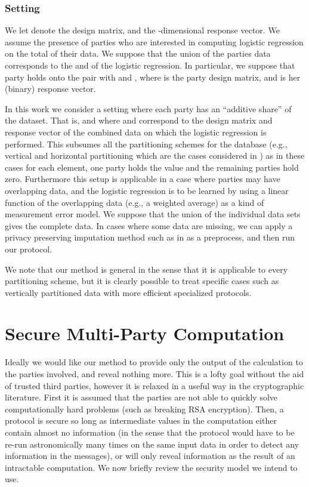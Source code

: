 \documentclass[11pt]{article}
\begin{document}
\subsubsection*{Setting}

We let  denote the  design matrix, and  the -dimensional response vector. We assume the presence of  parties who are interested in computing logistic regression on the total of their data.  We suppose that the union of the parties data corresponds to the  and  of the logistic regression.  In particular, we suppose that party  holds onto the pair  with  and , where  is the  party design matrix, and  is her (binary) response vector.

In this work we consider a setting where each party has an ``additive share'' of the dataset.  That is,  and  where  and  correspond to the design matrix and response vector of the combined data on which the logistic regression is performed.  This subsumes all the partitioning schemes for the database (e.g., vertical and horizontal partitioning which are the cases considered in \cite{ppdm_book}) as in these cases for each element, one party holds the value and the remaining parties hold zero.  Furthermore this setup is applicable in a case where parties may have overlapping data, and the logistic regression is to be learned by using a linear function of the overlapping data (e.g., a weighted average) as a kind of measurement error model.  We suppose that the union of the individual data sets gives the complete data.  In cases where some data are missing, we can apply a privacy preserving imputation method such as in \citet{jagannathan}  as a preprocess, and then run our protocol.

We note that our method is general in the sense that it is applicable to every partitioning scheme, but it is clearly possible to treat specific cases such as vertically partitioned data  with more efficient specialized protocols.


\section{Secure Multi-Party Computation}\label{sec:smpc}

Ideally we would like our method to provide only the output of the calculation to the parties involved, and reveal nothing more.  This is a lofty goal without the aid of trusted third parties, however it is relaxed in a useful way in the cryptographic literature.  First it is assumed that the parties are not able to quickly solve computationally hard problems (such as breaking RSA encryption).  Then, a protocol is secure so long as intermediate values in the computation either contain almost no information (in the sense that the protocol would have to be re-run astronomically many times on the same input data in order to detect any information in the messages), or will only reveal information as the result of an intractable computation.  We now briefly review the security model we intend to use.
\end{document}
